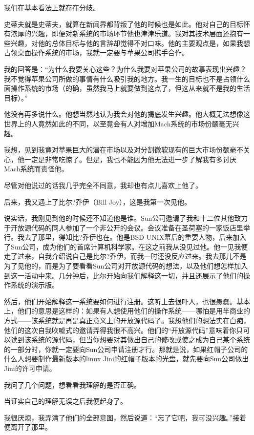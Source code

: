 我们在基本看法上就存在分歧。

史蒂夫就是史蒂夫，就算在新闻界都背叛了他的时候也是如此。他对自己的目标怀有浓厚的兴趣，即便对新系统的市场环节他也津津乐道。我对其技术层面还抱有一些兴趣，对他的总体目标与他的言辞却觉得不对口味。他的主要观点是，如果我想占领桌面操作系统的市场，我就一定要与苹果公司携手合作。

我的回答是：“为什么我要关心这些？为什么我要对苹果公司的故事表现出兴趣？我不觉得苹果公司所做的事情有什么吸引我的地方。我一生的目标也不是占领什么面操作系统的市场（的确，虽然我马上就要做到这点了，但这从来就不是我的生活目标）。”

他没有再多说什么。他想当然地认为我会对他的揭底发生兴趣。他大概无法想像这世界上的人竟然如此的不同，以至竟会有人对增加Mach系统的市场份额毫无兴趣。

我想，见到我竟对苹果巨大的潜在市场以及对分割微软现有的巨大市场份额毫不关心，他一定是非常吃惊了。但是，我也不能因为他无法进一步了解我有多讨厌Mach系统而责怪他。

尽管对他说过的话我几乎完全不同意，我却也有点儿喜欢上他了。

后来，我又遇上了比尔?乔伊（Bill Joy），这是我第一次见他。

说实话，我刚见到他的时候还不知道他是谁。Sun公司邀请了我和十二位其他致力于开放源代码的同人参加了一个非公开的会议。会议准备在圣荷塞的一家饭店里举行。我去了那里，得知比?乔伊也在。他是BSD UNIX幕后的重要人物，后来加入了Sun公司，成为他们的首席计算机科学家。在这之前我从没见过他。他一见我便走了过来，自我介绍说自己是比尔?乔伊，而我一时还没反应过来。我去那儿不是为了见他的，而是为了要看看Sun公司对开放源代码的想法，以及他们想怎样加入到这一活动中来。几分钟后，比尔开始向我们解释这一切，并且还展示了他们的操作系统的演示版。

然后，他们开始解释这一系统要如何进行注册。这听上去很吓人，也很愚蠢。基本上，他们的意思是这样的：如果有人想使用他们的操作系统——哪怕是用半商业的方式——该系统就是再是真正意义上的开放源代码了。我想他们的想法实在白痴，他们的这次自我吹嘘式的邀请弄得我很不高兴。他们的“开放源代码”意味着你只可以读到该系统的源代码，但当你想要对其做出自己的修改或使之成为自己某个系统的一部分时，你就一定要向Sun公司申请注册才行。那就是说，如果红帽子公司的什么人想要制作最新版本的linux Jini的红帽子版本的光盘，就先要向Sun公司做出Jini的许可申请。

我问了几个问题，想看看我理解的是否正确。

当证实自己的理解无误之后我便起身了。

我很厌烦，我弄清了他们的全部意图，然后说道：“忘了它吧，我可没兴趣。”接着便离开了那里。

